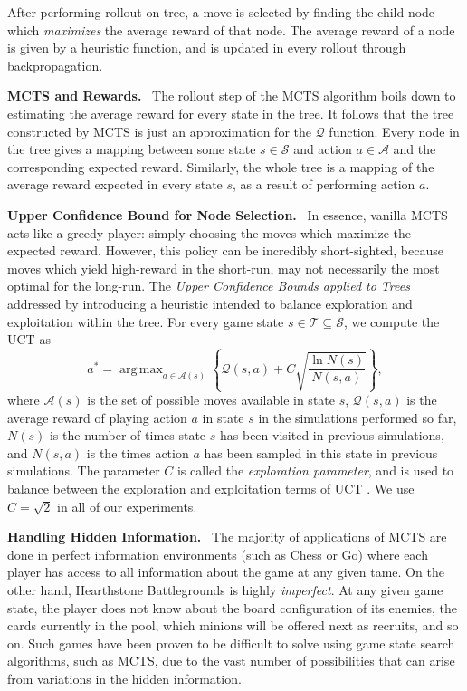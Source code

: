 \documentclass{paper}
\newcommand{\inlineSection}[1]{\vspace{0.5em}\noindent\textbf{#1.}~}
\DeclareMathOperator*{\argmax}{arg\,max}
\begin{document}
After performing rollout on tree, a move is selected by finding the child node which \textit{maximizes} the average reward of that node. The average reward of a node is given by a heuristic function, and is updated in every rollout through backpropagation. 


\inlineSection{MCTS and Rewards} The rollout step of the MCTS algorithm boils down to estimating the average reward for every state in the tree. It follows that the tree constructed by MCTS is just an approximation for the $\mathcal{Q}$ function. Every node in the tree gives a mapping between some state $s\in\mathcal{S}$ and action $a\in\mathcal{A}$ and the corresponding expected reward. Similarly, the whole tree is a mapping of the average reward expected in every state $s$, as a result of performing action $a$.

\inlineSection{Upper Confidence Bound for Node Selection} In essence, vanilla MCTS acts like a greedy player: simply choosing the moves which maximize the expected reward. However, this policy can be incredibly short-sighted, because moves which yield high-reward in the short-run, may not necessarily the most optimal for the long-run. The \textit{Upper Confidence Bounds applied to Trees} addressed by introducing a heuristic intended to balance exploration and exploitation within the tree. For every game state $s\in\mathcal{T}\subseteq\mathcal{S}$, we compute the UCT as
\begin{equation*}
    a^*=\argmax_{a\in\mathcal{A}(s)}\left\{\mathcal{Q}(s,a)+C\sqrt{\frac{\ln{N(s)}}{N(s,a)}}\right\},
\end{equation*}
where $\mathcal{A}(s)$ is the set of possible moves available in state $s$, $\mathcal{Q}(s,a)$ is the average reward of playing action $a$ in state $s$ in the simulations performed so far, $N(s)$ is the number of times state $s$ has been visited in previous simulations, and $N(s,a)$ is the times action $a$ has been sampled in this state in previous simulations. The parameter $C$ is called the \textit{exploration parameter}, and is used to balance between the exploration and exploitation terms of UCT \cite{bandit}. We use $C=\sqrt{2}$ in all of our experiments.

\inlineSection{Handling Hidden Information} The majority of applications of MCTS are done in perfect information environments (such as Chess or Go) where each player has access to all information about the game at any given tame. On the other hand, Hearthstone Battlegrounds is highly \textit{imperfect}. At any given game state, the player does not know about the board configuration of its enemies, the cards currently in the pool, which minions will be offered next as recruits, and so on. Such games have been proven to be difficult to solve using game state search algorithms, such as MCTS, due to the vast number of possibilities that can arise from variations in the hidden information.
\end{document}
